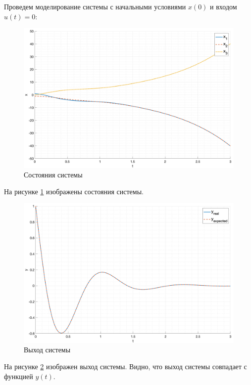 Проведем моделирование системы с начальными условиями $x(0)$ и входом $u(t) = 0$: 
\begin{figure}
    \centering
    \includegraphics[width=\textwidth]{media/plots/task4_states.png}
    \caption{Состояния системы}
    \label{fig:task4_states}
\end{figure}
На рисунке \ref{fig:task4_states} изображены состояния системы.
\begin{figure}
    \centering
    \includegraphics[width=\textwidth]{media/plots/task4_output.png}
    \caption{Выход системы}
    \label{fig:task4_output}
\end{figure}
На рисунке \ref{fig:task4_output} изображен выход системы. Видно, что выход системы совпадает с функцией $y(t)$.
